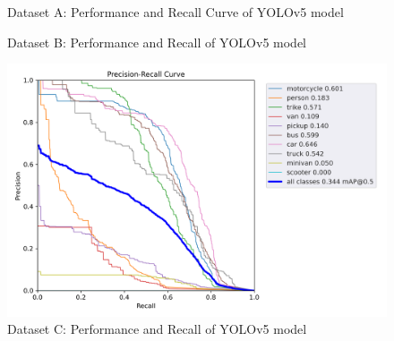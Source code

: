 \documentclass[12pt]{report} %
\begin{document}
		\begin{figure}[ht]
			\begin{floatrow}
				{
					\caption{Dataset A: Performance and Recall Curve of YOLOv5 model}
					\label{fig:ukDatasetYolov5LargeWeightPRCurve}
				}
			
				{
					\caption{Dataset B: Performance and Recall of YOLOv5 model}
					\label{fig:mtpDatasetYolov5LargeWeightPRCurve}
				}
			\end{floatrow}
		\end{figure}

		\begin{figure}[hb]
			\centering
			\includegraphics[width=.50\columnwidth]{Figures/dataset_c/PR_curve.png}
			\caption{Dataset C: Performance and Recall of YOLOv5 model}
			\label{fig:ntDatasetYolov5MediumWeightPRCurve}
		\end{figure}
\end{document}

